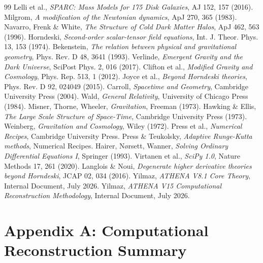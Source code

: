 \documentclass[12pt,a4paper]{article}
\numberwithin{equation}{section}
\begin{document}
\begin{thebibliography}{99}
 Lelli et al., \textit{SPARC: Mass Models for 175 Disk Galaxies}, AJ 152, 157 (2016).
 Milgrom, \textit{A modification of the Newtonian dynamics}, ApJ 270, 365 (1983).
 Navarro, Frenk \& White, \textit{The Structure of Cold Dark Matter Halos}, ApJ 462, 563 (1996).
 Horndeski, \textit{Second-order scalar-tensor field equations}, Int. J. Theor. Phys. 13, 153 (1974).
 Bekenstein, \textit{The relation between physical and gravitational geometry}, Phys. Rev. D 48, 3641 (1993).
 Verlinde, \textit{Emergent Gravity and the Dark Universe}, SciPost Phys. 2, 016 (2017).
 Clifton et al., \textit{Modified Gravity and Cosmology}, Phys. Rep. 513, 1 (2012).
 Joyce et al., \textit{Beyond Horndeski theories}, Phys. Rev. D 92, 024049 (2015).
 Carroll, \textit{Spacetime and Geometry}, Cambridge University Press (2004).
 Wald, \textit{General Relativity}, University of Chicago Press (1984).
 Misner, Thorne, Wheeler, \textit{Gravitation}, Freeman (1973).
 Hawking \& Ellis, \textit{The Large Scale Structure of Space-Time}, Cambridge University Press (1973).
 Weinberg, \textit{Gravitation and Cosmology}, Wiley (1972).
 Press et al., \textit{Numerical Recipes}, Cambridge University Press.
 Press \& Teukolsky, \textit{Adaptive Runge-Kutta methods}, Numerical Recipes.
 Hairer, Nørsett, Wanner, \textit{Solving Ordinary Differential Equations I}, Springer (1993).
 Virtanen et al., \textit{SciPy 1.0}, Nature Methods 17, 261 (2020).
 Langlois \& Noui, \textit{Degenerate higher derivative theories beyond Horndeski}, JCAP 02, 034 (2016).
 Yilmaz, \textit{ATHENA V8.1 Core Theory}, Internal Document, July 2026.
 Yilmaz, \textit{ATHENA V15 Computational Reconstruction Methodology}, Internal Document, July 2026.
\end{thebibliography}

\appendix
\section{Appendix A: Computational Reconstruction Summary}
\end{document}
